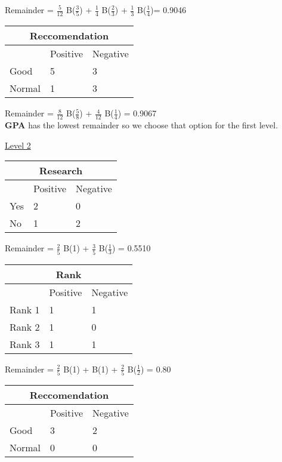 Remainder = $\frac{5}{12}$ B($\frac{3}{5}$) + $\frac{1}{4}$ B($\frac{2}{3}$)  + $\frac{1}{3}$ B($\frac{1}{4}$)= 0.9046\\

\begin{tabular}{ |p{3cm}||p{3cm}|p{3cm}| }
 \hline
 \multicolumn{3}{|c|}{Reccomendation} \\
 \hline
 & Positive & Negative\\
 \hline
 Good & 5 & 3\\
 Normal &   1 & 3\\
 \hline
\end{tabular}

Remainder = $\frac{8}{12}$ B($\frac{5}{8}$) + $\frac{4}{12}$ B($\frac{1}{4}$) = 0.9067\\

\textbf{GPA} has the lowest remainder so we choose that option for the first level.

\underline{Level 2}

\begin{tabular}{ |p{3cm}||p{3cm}|p{3cm}| }
 \hline
 \multicolumn{3}{|c|}{Research} \\
 \hline
 & Positive & Negative\\
 \hline
 Yes & 2 & 0\\
 No &   1 & 2\\
 \hline
\end{tabular}

Remainder = $\frac{2}{5}$ B(1) + $\frac{3}{5}$ B($\frac{1}{3}$) = 0.5510\\

\begin{tabular}{ |p{3cm}||p{3cm}|p{3cm}| }
 \hline
 \multicolumn{3}{|c|}{Rank} \\
 \hline
 & Positive & Negative\\
 \hline
 Rank 1 & 1 & 1\\
 Rank 2 &   1 & 0\\
 Rank 3 &   1 & 1\\
 \hline
\end{tabular}

Remainder = $\frac{2}{5}$ B(1) +  B(1) + $\frac{2}{5}$ B($\frac{1}{2}$) = 0.80\\

\begin{tabular}{ |p{3cm}||p{3cm}|p{3cm}| }
 \hline
 \multicolumn{3}{|c|}{Reccomendation} \\
 \hline
 & Positive & Negative\\
 \hline
 Good & 3 & 2\\
 Normal &   0 & 0\\
 \hline
\end{tabular}

